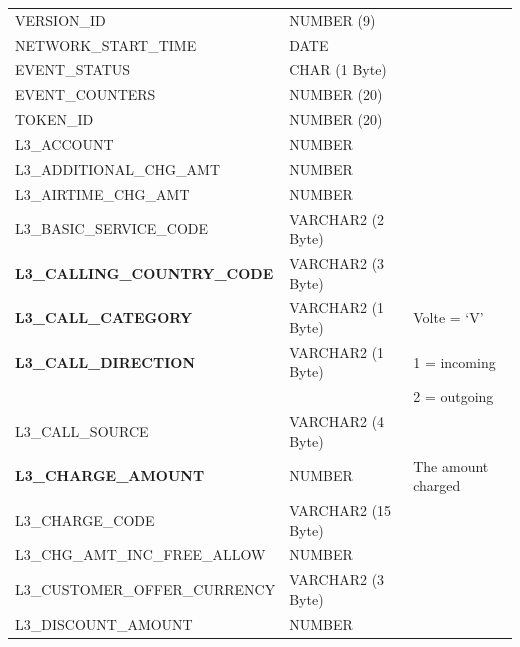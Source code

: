 \documentclass[12pt,twoside]{article}
\begin{document}
\begin{longtable}{lll}
 VERSION\_ID                             &  NUMBER (9)           &                            \\
 NETWORK\_START\_TIME                    &  DATE                 &                            \\
 EVENT\_STATUS                           &  CHAR (1 Byte)        &                            \\
 EVENT\_COUNTERS                         &  NUMBER (20)          &                            \\
 TOKEN\_ID                               &  NUMBER (20)          &                            \\
 L3\_ACCOUNT                             &  NUMBER               &                            \\
 L3\_ADDITIONAL\_CHG\_AMT                &  NUMBER               &                            \\
 L3\_AIRTIME\_CHG\_AMT                   &  NUMBER               &                            \\
 L3\_BASIC\_SERVICE\_CODE                &  VARCHAR2 (2 Byte)    &                            \\
 \textbf{L3\_CALLING\_COUNTRY\_CODE}     &  VARCHAR2 (3 Byte)    &                            \\
 \textbf{L3\_CALL\_CATEGORY}             &  VARCHAR2 (1 Byte)    &  Volte = `V'               \\
 \textbf{L3\_CALL\_DIRECTION}            &  VARCHAR2 (1 Byte)    &  1 = incoming              \\
                                         &                       &  2 = outgoing              \\
 L3\_CALL\_SOURCE                        &  VARCHAR2 (4 Byte)    &                            \\
 \textbf{L3\_CHARGE\_AMOUNT}             &  NUMBER               &  The amount charged        \\
 L3\_CHARGE\_CODE                        &  VARCHAR2 (15 Byte)   &                            \\
 L3\_CHG\_AMT\_INC\_FREE\_ALLOW          &  NUMBER               &                            \\
 L3\_CUSTOMER\_OFFER\_CURRENCY           &  VARCHAR2 (3 Byte)    &                            \\
 L3\_DISCOUNT\_AMOUNT                    &  NUMBER               &                            \\

\end{longtable}
\end{document}
